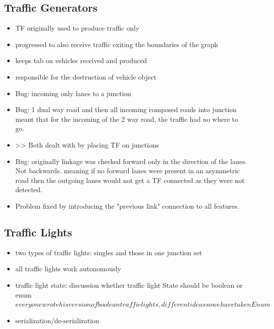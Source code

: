 \subsection{Traffic Generators}
\begin{itemize}
	\item TF originally used to produce traffic only
	\item progressed to also receive traffic exiting the boundaries of the graph
	\item keeps tab on vehicles received and produced
	\item responsible for the destruction of vehicle object
	\item Bug: incoming only lanes to a junction
	\item Bug: 1 dual way road and then all incoming composed roads into junction meant that for the incoming of the 2 way road, the traffic had no where to go.
	\item >> Both dealt with by placing TF on junctions
	\item Bug: originally linkage was checked forward only in the direction of the lanes. Not backwards. meaning if no forward lanes were present in an asymmetric road then the outgoing lanes would not get a TF connected as they were not detected.
	\item Problem fixed by introducing the "previous link" connection to all features.
\end{itemize}


\subsection{Traffic Lights}
\begin{itemize}
    \item two types of traffic lights: singles and those in one junction set
    \item all traffic lights work autonomously
	\item traffic light state: discussion whether traffic light State should be boolean or enum \(everyone wrote his version of boolean traffic lights, different ideas so we have taken Enum\)
\end{itemize}

\begin{itemize}
	\item serialization/de-serialization
\end{itemize}


